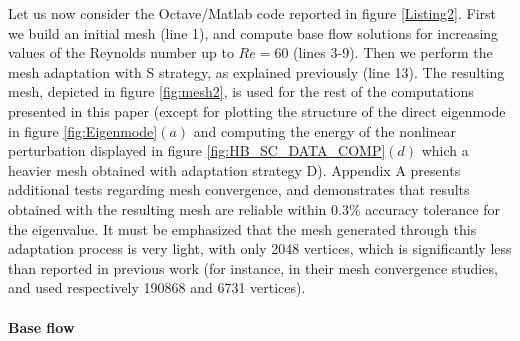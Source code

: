 \documentclass[twocolumn,10pt]{asme2ej}
\begin{document}
Let us now consider the Octave/Matlab code reported in figure \ref{Listing2}. First we build an initial mesh (line 1), and compute base flow solutions for increasing values of the Reynolds number up to $Re = 60$ (lines 3-9).
Then we perform the mesh adaptation with S strategy, as explained previously (line 13). 
The resulting mesh, depicted in figure \ref{fig:mesh2}, is used for the rest of the computations presented in this paper (except for plotting the structure of the direct eigenmode in figure \ref{fig:Eigenmode}$(a)$ and computing the energy of the nonlinear perturbation displayed in figure \ref{fig:HB_SC_DATA_COMP}$(d)$ which a heavier mesh obtained with adaptation strategy D). 
Appendix A presents additional tests regarding mesh convergence, and demonstrates that results obtained with the resulting mesh are reliable within $0.3\%$ accuracy tolerance for the eigenvalue. It must be emphasized  that the mesh generated through this adaptation process is very light, with only 2048 vertices, which is significantly less than reported in previous work (for instance, in their mesh convergence studies, \cite{SippLebedev} and \cite{MLugo2014} used respectively 190868  and 6731 vertices).










\paragraph{Base flow}
\end{document}
